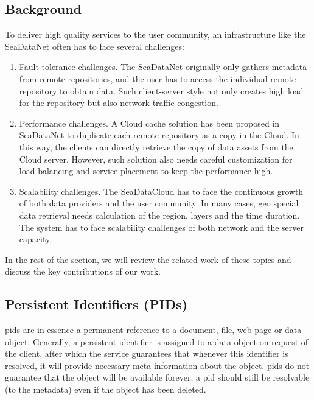 \documentclass[conference]{IEEEtran}
\begin{document}
\subsection{Background}
To deliver high quality services to the user community, an infrastructure like the SeaDataNet often has to face several challenges:
\begin{enumerate}
    \item Fault tolerance challenges. The SeaDataNet originally only gathers metadata from remote repositories, and the user has to access the individual remote repository to obtain data. Such client-server style not only creates high load for the repository but also network traffic congestion.
    \item Performance challenges. A Cloud cache solution has been proposed in SeaDataNet to duplicate each remote repository as a copy in the Cloud. In this way, the clients can directly retrieve the copy of data assets from the Cloud server. However, such solution also needs careful customization for load-balancing and service placement to keep the performance high.
    \item Scalability challenges. The SeaDataCloud has to face the continuous growth of both data providers and the user community. In many cases, geo special data retrieval needs calculation of the region, layers and the time duration. The system has to face scalability challenges of both network and the server capacity. 
\end{enumerate}
In the rest of the section, we will review the related work of these topics and discuss the key contributions of our work. 

\subsection{Persistent Identifiers (PIDs)}
\label{sec:pids}

\glspl{pid} are in essence a permanent reference to a document, file, web page or data object. Generally, a persistent identifier is assigned to a data object on request of the client, after which the service guarantees that whenever this identifier is resolved, it will provide necessary meta information about the object. \glspl{pid} do not guarantee that the object will be available forever; a \gls{pid} should still be resolvable (to the metadata) even if the object has been deleted. 
\end{document}
